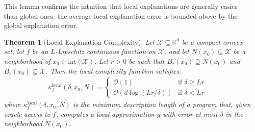\documentclass[11pt,letter,leqno]{article}
\newtheorem{theorem}{Theorem}[section]
\begin{document}
This lemma confirms the intuition that local explanations are generally easier than global ones: the average local explanation error is bounded above by the global explanation error.

\begin{theorem}[Local Explanation Complexity]
\label{thm:local-complexity}
Let $\mathcal{X} \subseteq \mathbb{R}^d$ be a compact convex set, let $f$ be an $L$-Lipschitz continuous function on $\mathcal{X}$, and let $N(x_0) \subseteq \mathcal{X}$ be a neighborhood of $x_0 \in \mathrm{int}(\mathcal{X})$. Let $r > 0$ be such that $B_r(x_0) \supseteq N(x_0)$ and $B_r(x_0) \subseteq \mathcal{X}$. Then the local complexity function satisfies:
\begin{align}
\kappa_f^{\text{local}}(\delta, x_0, N) = 
\begin{cases}
\mathcal{O}(1) & \text{if } \delta \geq Lr \\
\mathcal{O}(d \log(Lr/\delta)) & \text{if } \delta < Lr
\end{cases}
\end{align}
where $\kappa_f^{\text{local}}(\delta, x_0, N)$ is the minimum description length of a program that, given oracle access to $f$, computes a local approximation $g$ with error at most $\delta$ in the neighborhood $N(x_0)$.
\end{theorem}
\end{document}
